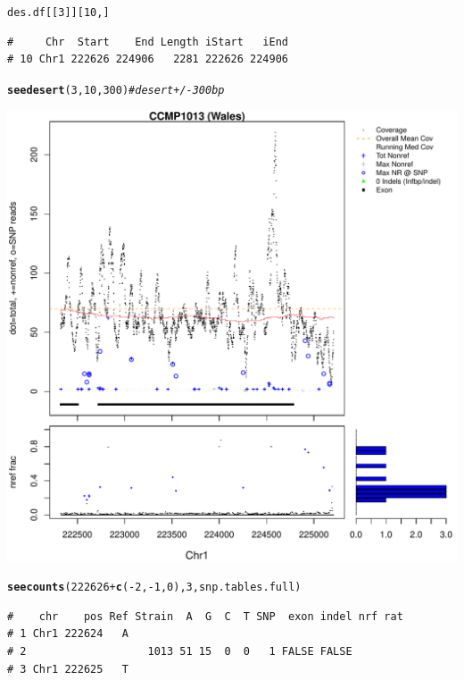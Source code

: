 \documentclass{article}\usepackage[]{graphicx}\usepackage[]{color}
\makeatletter
\def\maxwidth{ %
  \ifdim\Gin@nat@width>\linewidth
    \linewidth
  \else
    \Gin@nat@width
  \fi
}
\newcommand{\hlnum}[1]{\textcolor[rgb]{0.686,0.059,0.569}{#1}}%
\newcommand{\hlcom}[1]{\textcolor[rgb]{0.678,0.584,0.686}{\textit{#1}}}%
\newcommand{\hlopt}[1]{\textcolor[rgb]{0,0,0}{#1}}%
\newcommand{\hlstd}[1]{\textcolor[rgb]{0.345,0.345,0.345}{#1}}%
\newcommand{\hlkwd}[1]{\textcolor[rgb]{0.737,0.353,0.396}{\textbf{#1}}}%
\newenvironment{kframe}{%
 \def\at@end@of@kframe{}%
 \ifinner\ifhmode%
  \def\at@end@of@kframe{\end{minipage}}%
  \begin{minipage}{\columnwidth}%
 \fi\fi%
 \def\FrameCommand##1{\hskip\@totalleftmargin \hskip-\fboxsep
 \colorbox{shadecolor}{##1}\hskip-\fboxsep
     \hskip-\linewidth \hskip-\@totalleftmargin \hskip\columnwidth}%
 \MakeFramed {\advance\hsize-\width
   \@totalleftmargin\z@ \linewidth\hsize
   \@setminipage}}%
 {\par\unskip\endMakeFramed%
 \at@end@of@kframe}
\newenvironment{knitrout}{}{} %
\makeatother
\begin{document}
\begin{knitrout}
\begin{kframe}\begin{alltt}
\hlstd{des.df[[}\hlnum{3}\hlstd{]][}\hlnum{10}\hlstd{,]}
\end{alltt}
\begin{verbatim}
#     Chr  Start    End Length iStart   iEnd
# 10 Chr1 222626 224906   2281 222626 224906
\end{verbatim}
\begin{alltt}
\hlkwd{seedesert}\hlstd{(}\hlnum{3}\hlstd{,}\hlnum{10}\hlstd{,} \hlnum{300}\hlstd{)}   \hlcom{# desert +/-300 bp}
\end{alltt}
\end{kframe}
\includegraphics[width=\maxwidth]{figs-knitr/unnamed-chunk-17-2} 
\begin{kframe}\begin{alltt}
\hlkwd{seecounts}\hlstd{(}\hlnum{222626}\hlopt{+}\hlkwd{c}\hlstd{(}\hlopt{-}\hlnum{2}\hlstd{,}\hlopt{-}\hlnum{1}\hlstd{,}\hlnum{0}\hlstd{),}\hlnum{3}\hlstd{,snp.tables.full)}
\end{alltt}
\begin{verbatim}
#    chr    pos Ref Strain  A  G  C  T SNP  exon indel nrf rat
# 1 Chr1 222624   A                                           
# 2                   1013 51 15  0  0   1 FALSE FALSE        
# 3 Chr1 222625   T                                           

\end{verbatim}
\end{kframe}
\end{knitrout}
\end{document}
